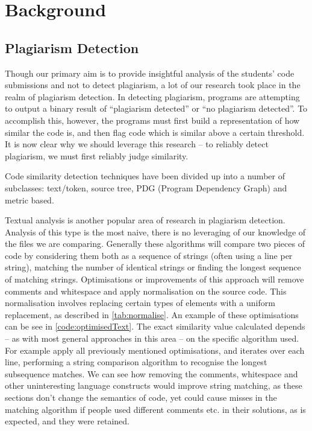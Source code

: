 \chapter{Background}

\label{Background}


\section{Plagiarism Detection}

Though our primary aim is to provide insightful analysis of the students' code 
submissions and not to detect plagiarism, a lot of our research took 
place in the realm of plagiarism detection. In detecting plagiarism, programs are attempting
to output a binary result of ``plagiarism detected'' or ``no plagiarism detected''.
To accomplish this, however, the programs must first build a representation of 
how similar the code is, and then flag code which is similar above a certain threshold.
It is now clear why we should leverage this research -- to reliably detect plagiarism,
we must first reliably judge similarity.

Code similarity detection techniques have been divided up into a number of subclasses:
text/token, source tree, PDG (Program Dependency Graph) and metric based\cite{CloneDetection}.

Textual analysis is another popular area of research in plagiarism
detection. Analysis of this type is the most naive, there is no leveraging
of our knowledge of the files we are comparing. Generally these algorithms
will compare two pieces of code by considering them both as a sequence of
strings (often using a line per string), matching the number of identical
strings or finding the longest sequence of matching strings. 
Optimisations or improvements of this approach will remove comments and whitespace
and apply normalisation on the source code. This normalisation involves replacing
certain types of elements with a uniform replacement, as described in 
\cref{tab:normalise}. An example of these optimisations can be see in 
\cref{code:optimisedText}. The exact similarity value calculated depends -- as
with most general approaches in this area -- on the specific algorithm used.
For example \cite{DucasseText} apply all previously mentioned optimisations,
and iterates over each line, performing a string comparison algorithm to recognise
the longest subsequence matches. We can see how removing the comments,
whitespace and other uninteresting language constructs would improve string
matching, as these sections don't change the semantics of code, yet could cause
misses in the matching algorithm if people used different comments etc. in
their solutions, as is expected, and they were retained.

